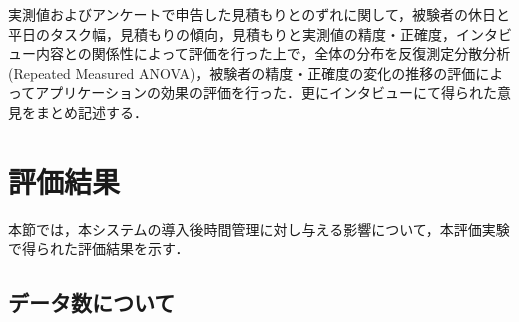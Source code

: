 実測値およびアンケートで申告した見積もりとのずれに関して，被験者の休日と平日のタスク幅，見積もりの傾向，見積もりと実測値の精度・正確度，インタビュー内容との関係性によって評価を行った上で，全体の分布を反復測定分散分析(Repeated Measured ANOVA)，被験者の精度・正確度の変化の推移の評価によってアプリケーションの効果の評価を行った．更にインタビューにて得られた意見をまとめ記述する．

\section{評価結果}
本節では，本システムの導入後時間管理に対し与える影響について，本評価実験で得られた評価結果を示す．
\subsection{データ数について}
